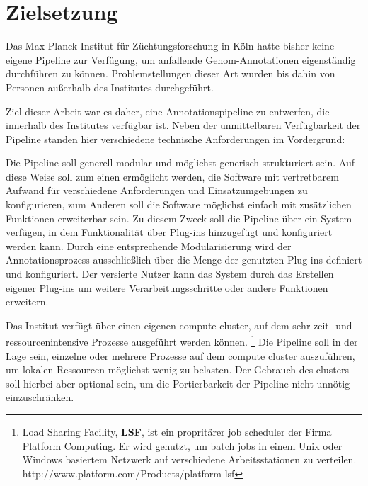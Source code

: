 
\chapter{Zielsetzung}
Das Max-Planck Institut für Züchtungsforschung in Köln hatte bisher keine
eigene Pipeline zur Verfügung, um anfallende Genom-Annotationen eigenständig
durchführen zu können. Problemstellungen dieser Art wurden bis dahin von
Personen außerhalb des Institutes durchgeführt.

Ziel dieser Arbeit war es daher, eine Annotationspipeline zu entwerfen, die
innerhalb des Institutes verfügbar ist. Neben der unmittelbaren Verfügbarkeit
der Pipeline standen hier verschiedene technische Anforderungen im Vordergrund:

Die Pipeline soll generell modular und möglichst generisch strukturiert sein.
Auf diese Weise soll zum einen ermöglicht werden, die Software mit vertretbarem
Aufwand für verschiedene Anforderungen und Einsatzumgebungen zu konfigurieren,
zum Anderen soll die Software möglichst einfach mit zusätzlichen Funktionen
erweiterbar sein.
Zu diesem Zweck soll die Pipeline über ein  System verfügen, in
dem Funktionalität über Plug-ins hinzugefügt und konfiguriert werden kann.
Durch eine entsprechende  Modularisierung wird der Annotationsprozess
ausschließlich über die Menge der genutzten Plug-ins definiert und
konfiguriert.
Der versierte Nutzer kann das System durch das Erstellen eigener Plug-ins um
weitere Verarbeitungsschritte oder andere Funktionen erweitern.

Das Institut verfügt über einen eigenen compute cluster, auf dem sehr zeit- und
ressourcenintensive Prozesse ausgeführt werden können.
\footnote{Load Sharing Facility, \textbf{LSF}, ist ein propritärer job scheduler
der Firma Platform Computing. Er wird genutzt, um batch jobs in einem Unix oder
Windows basiertem Netzwerk auf verschiedene Arbeitsstationen zu
verteilen.\citep{ault_oracle_2004}
{http://www.platform.com/Products/platform-lsf}}
Die Pipeline soll in der Lage sein, einzelne oder mehrere Prozesse auf dem
compute cluster auszuführen, um lokalen Ressourcen möglichst wenig zu
belasten. Der Gebrauch des clusters soll hierbei aber optional sein, um die
Portierbarkeit der Pipeline nicht unnötig einzuschränken.


